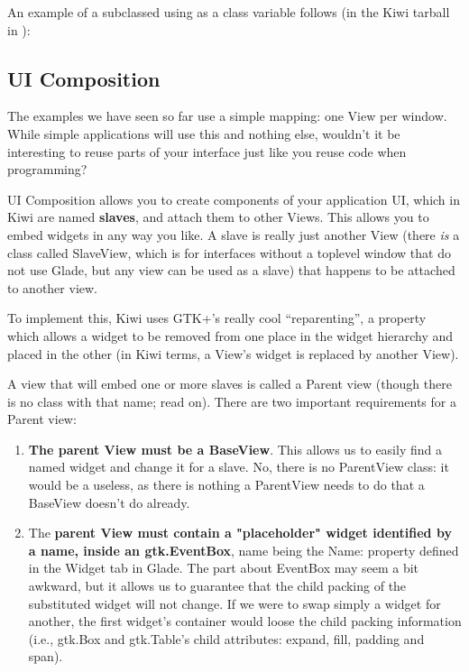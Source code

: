 \documentclass[a4paper]{howto}
\begin{document}
An example of a subclassed  using  as a
class variable follows (in the Kiwi tarball in
):



\subsection{UI Composition}

The examples we have seen so far use a simple mapping: one View per
window. While simple applications will use this and nothing else,
wouldn't it be interesting to reuse parts of your interface just like
you reuse code when programming?

UI Composition allows you to create components of your application UI,
which in Kiwi are named {\bf slaves}, and attach them to other Views.
This allows you to embed widgets in any way you like. A slave is really
just another View (there {\it is} a class called SlaveView, which is for
interfaces without a toplevel window that do not use Glade, but any view
can be used as a slave) that happens to be attached to another view.

To implement this, Kiwi uses GTK+'s really cool ``reparenting'', a
property which allows a widget to be removed from one place in the
widget hierarchy and placed in the other (in Kiwi terms, a View's widget
is replaced by another View).

A view that will embed one or more slaves is called a Parent view
(though there is no class with that name; read on). There are two
important requirements for a Parent view:

\begin{enumerate}
\item {\bf The parent View must be a BaseView}. This allows us to
easily find a named widget and change it for a slave. No, there is no
ParentView class: it would be a useless, as there is nothing a
ParentView needs to do that a BaseView doesn't do already.
\item The {\bf parent View must contain a "placeholder" widget
identified by a name, inside an gtk.EventBox}, name being the Name: property
defined in the Widget tab in Glade. The part about EventBox may seem a
bit awkward, but it allows us to guarantee that the child packing of the
substituted widget will not change. If we were to swap simply a widget
for another, the first widget's container would loose the child packing
information (i.e., gtk.Box and gtk.Table's child attributes: expand, fill,
padding and span).
\end{enumerate}
\end{document}
